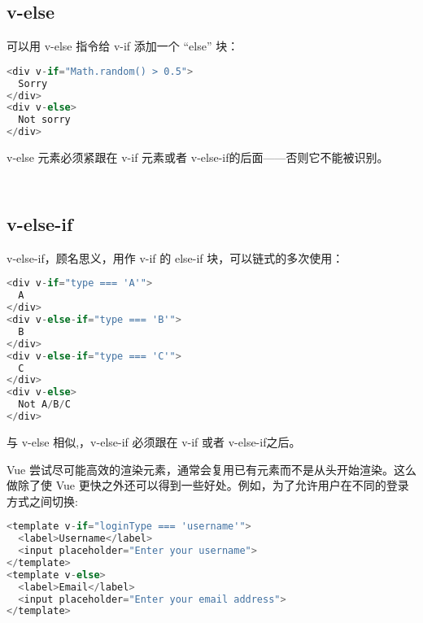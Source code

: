 \begin{lstlisting}[language=JavaScript]

\end{lstlisting}


\subsection{v-else}

可以用 v-else 指令给 v-if 添加一个 “else” 块：


\begin{lstlisting}[language=JavaScript]
<div v-if="Math.random() > 0.5">
  Sorry
</div>
<div v-else>
  Not sorry
</div>
\end{lstlisting}

v-else 元素必须紧跟在 v-if 元素或者 v-else-if的后面——否则它不能被识别。

\begin{lstlisting}[language=JavaScript]

\end{lstlisting}



\begin{lstlisting}[language=JavaScript]

\end{lstlisting}


\subsection{v-else-if}

v-else-if，顾名思义，用作 v-if 的 else-if 块，可以链式的多次使用：

\begin{lstlisting}[language=JavaScript]
<div v-if="type === 'A'">
  A
</div>
<div v-else-if="type === 'B'">
  B
</div>
<div v-else-if="type === 'C'">
  C
</div>
<div v-else>
  Not A/B/C
</div>
\end{lstlisting}

与 v-else 相似,，v-else-if 必须跟在 v-if 或者 v-else-if之后。


Vue 尝试尽可能高效的渲染元素，通常会复用已有元素而不是从头开始渲染。这么做除了使 Vue 更快之外还可以得到一些好处。例如，为了允许用户在不同的登录方式之间切换:



\begin{lstlisting}[language=JavaScript]
<template v-if="loginType === 'username'">
  <label>Username</label>
  <input placeholder="Enter your username">
</template>
<template v-else>
  <label>Email</label>
  <input placeholder="Enter your email address">
</template>
\end{lstlisting}

